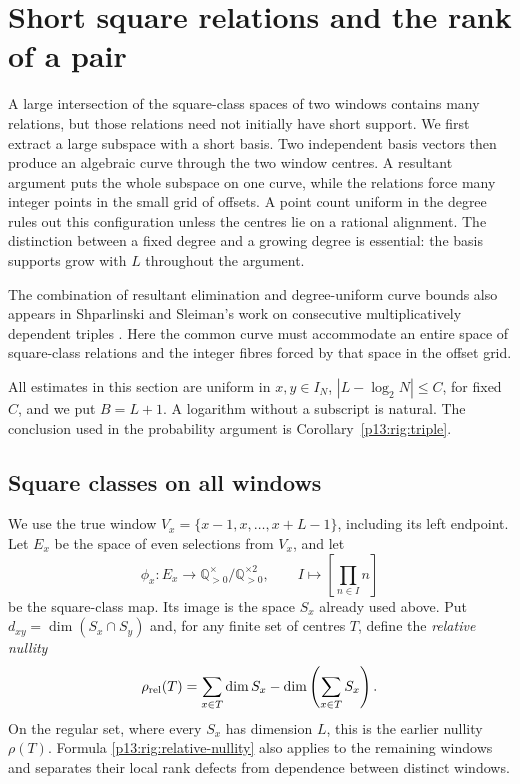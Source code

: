 \section{Short square relations and the rank of a pair}
\label{p13:rig:section}

A large intersection of the square-class spaces of two windows
contains many relations, but those relations need not initially have
short support.  We first extract a large subspace with a short basis.
Two independent basis vectors then produce an algebraic curve through
the two window centres.  A resultant argument puts the whole subspace
on one curve, while the relations force many integer points in the
small grid of offsets.  A point count uniform in the degree rules out
this configuration unless the centres lie on a rational alignment.
The distinction between a fixed degree and a growing degree is
essential: the basis supports grow with $L$ throughout the argument.

The combination of resultant elimination and degree-uniform curve
bounds also appears in Shparlinski and Sleiman's work on consecutive
multiplicatively dependent triples
\cite[Theorem~1.1 and Section~3]{shparlinskisleiman2026}.
Here the common curve must accommodate an entire space of square-class
relations and the integer fibres forced by that space in the offset grid.

All estimates in this section are uniform in
$x,y\in I_N$, $|L-\log_2N|\le C$, for fixed $C$, and we put
$B=L+1$.  A logarithm without a subscript is natural.
The conclusion used in the probability argument is
Corollary~\ref{p13:rig:triple}.

\subsection{Square classes on all windows}
\label{p13:rig:notation}

We use the true window
$V_x=\{x-1,x,\ldots,x+L-1\}$, including its left endpoint.
Let $E_x$ be the space of even selections from $V_x$, and let
\[
 \phi_x:E_x\longrightarrow
 \mathbb Q_{>0}^{\times}/\mathbb Q_{>0}^{\times2},
 \qquad I\longmapsto\left[\prod_{n\in I}n\right]
\]
be the square-class map.  Its image is the space $S_x$ already used
above.  Put $d_{xy}=\dim(S_x\cap S_y)$ and, for any finite set of
centres $T$, define the \emph{relative nullity}
\begin{equation}
 \rho_{\rm rel}(T)=\sum_{x\in T}\dim S_x-
                         \dim\left(\sum_{x\in T}S_x\right).
 \label{p13:rig:relative-nullity}
\end{equation}
On the regular set, where every $S_x$ has dimension $L$, this is
the earlier nullity $\rho(T)$.  Formula
\eqref{p13:rig:relative-nullity} also applies to the remaining
windows and separates their local rank defects from dependence
between distinct windows.

